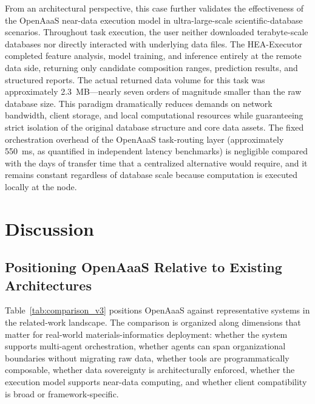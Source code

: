 \documentclass{article}
\begin{document}
From an architectural perspective, this case further validates the effectiveness of the OpenAaaS near-data execution model in ultra-large-scale scientific-database scenarios. Throughout task execution, the user neither downloaded terabyte-scale databases nor directly interacted with underlying data files. The HEA-Executor completed feature analysis, model training, and inference entirely at the remote data side, returning only candidate composition ranges, prediction results, and structured reports. The actual returned data volume for this task was approximately 2.3~MB---nearly seven orders of magnitude smaller than the raw database size. This paradigm dramatically reduces demands on network bandwidth, client storage, and local computational resources while guaranteeing strict isolation of the original database structure and core data assets. The fixed orchestration overhead of the OpenAaaS task-routing layer (approximately 550~ms, as quantified in independent latency benchmarks) is negligible compared with the days of transfer time that a centralized alternative would require, and it remains constant regardless of database scale because computation is executed locally at the node.


\section{Discussion}
\label{sec:discussion}

\subsection{Positioning OpenAaaS Relative to Existing Architectures}

Table~\ref{tab:comparison_v3} positions OpenAaaS against representative systems in the related-work landscape. The comparison is organized along dimensions that matter for real-world materials-informatics deployment: whether the system supports multi-agent orchestration, whether agents can span organizational boundaries without migrating raw data, whether tools are programmatically composable, whether data sovereignty is architecturally enforced, whether the execution model supports near-data computing, and whether client compatibility is broad or framework-specific.
\end{document}
